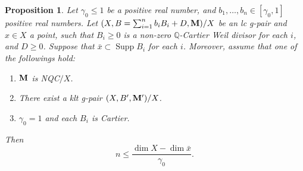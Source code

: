 \documentclass[11pt]{amsart}
\numberwithin{equation}{section}
\newcommand{\Mm}{{\bf{M}}}
\newcommand{\Qq}{\mathbb{Q}}
\newcommand{\Supp}{\operatorname{Supp}}
\newtheorem{prop}[thm]{Proposition}
\theoremstyle{definition}
\theoremstyle{definition}
\theoremstyle{definition}
\begin{document}
\begin{prop}\label{prop: bound number of components}
Let $\gamma_0\le1$ be a positive real number, and $b_1,\dots,b_n\in [\gamma_0,1]$ positive real numbers. Let $(X,B=\sum_{i=1}^nb_iB_i+D,\Mm)/X$ be an lc g-pair and $x\in X$ a point, such that $B_i\geq 0$ is a non-zero $\Qq$-Cartier Weil divisor for each $i$, and $D\geq 0$. Suppose that $\bar x\subset\Supp B_i$ for each $i$. Moreover, assume that one of the followings hold:
    \begin{enumerate}
        \item $\Mm$ is NQC$/X$.
        \item There exist a klt g-pair $(X,B',\Mm')/X$.
        \item $\gamma_0=1$ and each $B_i$ is Cartier.
    \end{enumerate}
Then 
$$n\leq\frac{\dim X-\dim\bar x}{\gamma_0}.$$
\end{prop}
\end{document}
